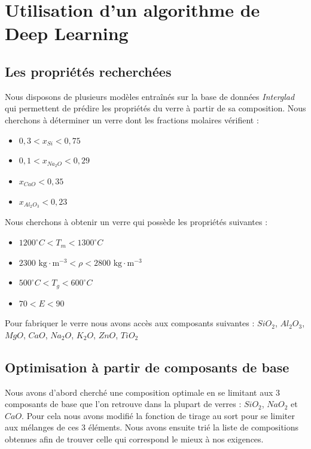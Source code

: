 \documentclass{article}
\begin{document}
\section{Utilisation d'un algorithme de Deep Learning}
\subsection{Les propriétés recherchées}

Nous disposons de plusieurs modèles entraînés sur la base de données \textit{Interglad} qui permettent de prédire les propriétés du verre à partir de sa composition. Nous cherchons à déterminer un verre dont les fractions molaires vérifient :

\begin{itemize}
    \item $0,3 < x_{Si} < 0,75$
    \item $0,1 < x_{Na_2O} < 0,29$
    \item $x_{CaO} < 0,35$
    \item $x_{Al_2O_3} < 0,23$
\end{itemize} 

Nous cherchons à obtenir un verre qui possède les propriétés suivantes :

\begin{itemize}
    \item $1200 ^{\circ} C < T_m < 1300 ^{\circ} C$
    \item $2300 \text{ kg} \cdot \text{m}^{-3} < \rho < 2800 \text{ kg} \cdot \text{m}^{-3}$
    \item $500 ^{\circ} C < T_g < 600 ^{\circ} C$
    \item $70 < E < 90$
\end{itemize}

Pour fabriquer le verre nous avons accès aux composants suivantes : $SiO_2$, $Al_2O_3$, $MgO$, $CaO$, $Na_2O$, $K_2O$, $ZnO$, $TiO_2$

\subsection{Optimisation à partir de composants de base}

Nous avons d'abord cherché une composition optimale en se limitant aux 3 composants de base que l'on retrouve dans la plupart de verres : $SiO_2$, $NaO_2$ et $CaO$. Pour cela nous avons modifié la fonction de tirage au sort pour se limiter aux mélanges de ces 3 éléments. Nous avons ensuite trié la liste de compositions obtenues afin de trouver celle qui correspond le mieux à nos exigences.
\end{document}
